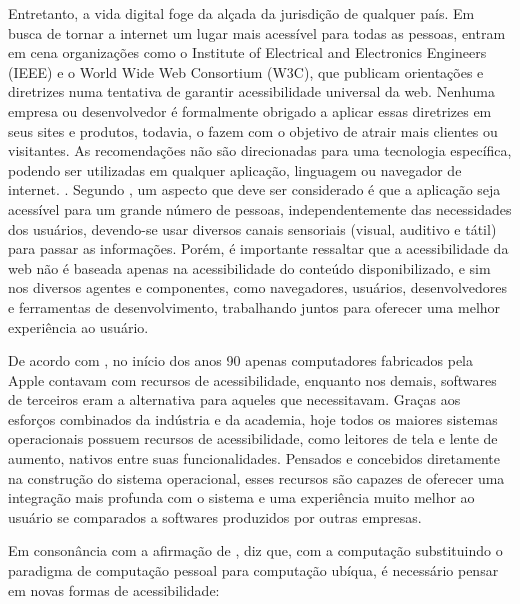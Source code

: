 \documentclass[english,brazilian]{UNISINOSmonografia}
\begin{document}
Entretanto, a vida digital foge da alçada da jurisdição de qualquer país. Em busca de tornar a internet um lugar mais acessível para todas as pessoas, entram em cena organizações como o Institute of Electrical and Electronics Engineers (IEEE) e o World Wide Web Consortium (W3C), que publicam orientações e diretrizes numa tentativa de garantir acessibilidade universal da web. Nenhuma empresa ou desenvolvedor é formalmente obrigado a aplicar essas diretrizes em seus sites e produtos, todavia, o fazem com o objetivo de atrair mais clientes ou visitantes. As recomendações não são direcionadas para uma tecnologia específica, podendo ser utilizadas em qualquer aplicação, linguagem ou navegador de internet. \cite{W3Cguideliness}. Segundo , um aspecto que deve ser considerado é que a aplicação seja acessível para um grande número de pessoas, independentemente das necessidades dos usuários, devendo-se usar diversos canais sensoriais (visual, auditivo e tátil) para passar as informações. Porém, é importante ressaltar que a acessibilidade da web não é baseada apenas na acessibilidade do conteúdo disponibilizado, e sim nos diversos agentes e componentes, como navegadores, usuários, desenvolvedores e ferramentas de desenvolvimento, trabalhando juntos para oferecer uma melhor experiência ao usuário.

De acordo com , no início dos anos 90 apenas computadores fabricados pela Apple contavam com recursos de acessibilidade, enquanto nos demais, softwares de terceiros eram a alternativa para aqueles que necessitavam. Graças aos esforços combinados da indústria e da academia, hoje todos os maiores sistemas operacionais possuem recursos de acessibilidade, como leitores de tela e lente de aumento, nativos entre suas funcionalidades. Pensados e concebidos diretamente na construção do sistema operacional, esses recursos são capazes de oferecer uma integração mais profunda com o sistema e uma experiência muito melhor ao usuário se comparados a softwares produzidos por outras empresas. 

Em consonância com a afirmação de ,  diz que, com a computação substituindo o paradigma de computação pessoal para computação ubíqua, é necessário pensar em novas formas de acessibilidade:
\end{document}
